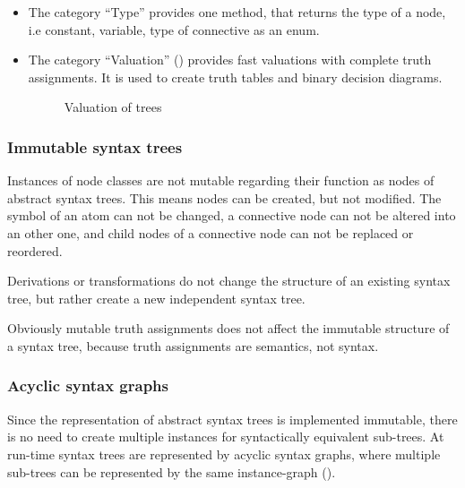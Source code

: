 \begin{itemize}
\item The  category “Type” provides one method, that returns the type of a node, i.e constant, variable, type of connective as an enum.


\item The category “Valuation” () 
provides fast valuations with complete truth assignments. 
It is used to create truth tables and binary decision diagrams. 

\begin{figure}[htbp]
\begin{center}
\caption{Valuation of trees}
\label{fig:NyayaNodeValuation}
\end{center}
\end{figure}

\end{itemize}
\subsubsection{Immutable syntax trees}

Instances of node classes are not mutable 
regarding their function as nodes of abstract syntax trees. 
This means nodes can be created, but not modified.
The symbol of an atom can not be changed, 
a connective node can not be altered into an other one,
and child nodes of a connective node can not be replaced or reordered.

Derivations or transformations do not change the structure of an existing syntax tree,
but rather create a new independent syntax tree.

Obviously mutable truth assignments does not affect the immutable structure of a syntax tree,
because truth assignments are semantics, not syntax. 

\subsubsection{Acyclic syntax graphs}

Since the representation of abstract syntax trees is implemented immutable,
there is no need to create multiple instances for syntactically equivalent sub-trees. 
At run-time syntax trees are represented by acyclic syntax graphs, 
where multiple sub-trees can be represented by the same instance-graph
().

